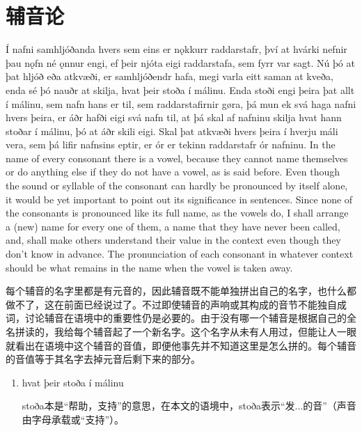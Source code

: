 \section{辅音论}
\begin{paracol}{2}
    Í nafni samhljóðanda hvers sem eins er nǫkkurr raddarstafr, því at hvárki nefnir þau nǫfn né ǫnnur engi, ef þeir njóta eigi raddarstafa, sem fyrr var sagt. Nú þó at þat hljóð eða atkvæði, er samhljóðendr hafa, megi varla eitt saman at kveða, enda sé þó nauðr at skilja, hvat þeir stoða í málinu. Enda stoði engi þeira þat allt í málinu, sem nafn hans er til, sem raddarstafirnir gøra, þá mun ek svá haga nafni hvers þeira, er áðr hafði eigi svá nafn til, at þá skal af nafninu skilja hvat hann stoðar í málinu, þó at áðr skili eigi. Skal þat atkvæði hvers þeira í hverju máli vera, sem þá lifir nafnsins eptir, er ór er tekinn raddarstafr ór nafninu.
    \switchcolumn
    In the name of every consonant there is a vowel, because they cannot name themselves or do anything else if they do not have a vowel, as is said before. Even though the sound or syllable of the consonant can hardly be pronounced by itself alone, it would be yet important to point out its significance in sentences. Since none of the consonants is pronounced like its full name, as the vowels do, I shall arrange a (new) name for every one of them, a name that they have never been called, and, shall make others understand their value in the context even though they don't know in advance. The pronunciation of each consonant in whatever context should be what remains in the name when the vowel is taken away.
\end{paracol}
\begin{translation*}{}
    每个辅音的名字里都是有元音的，因此辅音既不能单独拼出自己的名字，也什么都做不了，这在前面已经说过了。不过即使辅音的声响或其构成的音节不能独自成词，讨论辅音在语境中的重要性仍是必要的。由于没有哪一个辅音是根据自己的全名拼读的，我给每个辅音起了一个新名字。这个名字从未有人用过，但能让人一眼就看出在语境中这个辅音的音值，即便他事先并不知道这里是怎么拼的。每个辅音的音值等于其名字去掉元音后剩下来的部分。
\end{translation*}
\begin{grammar*}{}
    \begin{enumerate}[leftmargin=*]
        \item hvat þeir stoða í málinu

              stoða本是“帮助，支持”的意思，在本文的语境中，stoða表示“发...的音”（声音由字母承载或“支持”）。
    \end{enumerate}
\end{grammar*}
